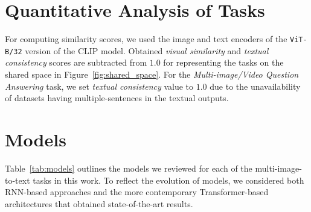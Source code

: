 \appendix

\section{Quantitative Analysis of Tasks}
\label{appendix:a}
For computing similarity scores, we used the image and text encoders of the \verb|ViT-B/32| version of the CLIP model. Obtained \textit{visual similarity} and \textit{textual consistency} scores are subtracted from $1.0$ for representing the tasks on the shared space in Figure~\ref{fig:shared_space}. For the \textit{Multi-image/Video Question Answering} task, we set \textit{textual consistency} value to $1.0$ due to the unavailability of datasets having multiple-sentences in the textual outputs.

\section{Models}
\label{appendix:b}
Table~\ref{tab:models} outlines the models we reviewed for each of the multi-image-to-text tasks in this work. To reflect the evolution of models, we considered both RNN-based approaches and the more contemporary Transformer-based architectures that obtained state-of-the-art results.

